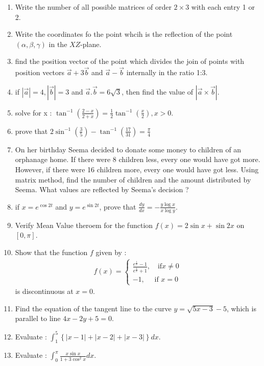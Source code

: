 \documentclass[journal,12pt,onecolumn]{IEEEtran}
\theoremstyle{remark}
\providecommand{\sbrak}[1]{\ensuremath{{}\left[#1\right]}}
\providecommand{\brak}[1]{\ensuremath{\left(#1\right)}}
\providecommand{\cbrak}[1]{\ensuremath{\left\{#1\right\}}}
\providecommand{\abs}[1]{\left\vert#1\right\vert}
\begin{document}
\begin{enumerate}
    \item Write the number of all possible matrices of order $2\times 3$ with each entry 1 or 2.
    \item Write the coordinates fo the point whcih is the reflection of the point \brak{\alpha,\beta,\gamma} in the $XZ$-plane.
    \item find the position vector of the point which divides the join of points with position vectors $\vec{a}+3\vec{b}$ and $\vec{a}-\vec{b}$ internally in the ratio 1:3.
    \item if $\abs{\vec{a}} = 4 , \abs{\vec{b}}=3$  and $\vec{a}.\vec{b}=6\sqrt{3}$, then find the value of $\abs{\vec{a}\times \vec{b}}$.
    \item solve for x : $\tan^{-1}\brak{\frac{2-x}{2+x}}=\frac{1}{2} \tan^{-1}\brak{\frac{x}{2}},x>0$.
    \item prove that $2\sin^{-1}\brak{\frac{3}{5}}-\tan^{-1}\brak{\frac{17}{31}}=\frac{\pi}{4}$
    \item On her birthday Seema decided to donate some money to children of an orphanage home. If there were 8 children less, every one would have got  more. However, if there were 16 children more, every one would have got  less. Using matrix method, find the number of children and the amount distributed by Seema. What values are reflected by Seema's decision ?
    \item if $x=e^{\cos 2t}$ and $y=e^{\sin 2t}$, prove that $\frac{dy}{dx}= -\frac{y \log x}{x \log y}$.
    \item Verify Mean Value theroem for the function $f\brak{x}= 2\sin x + \sin 2x$ on $\sbrak{0,\pi}$.
    \item Show that the function $f$ given by :
          \begin{align*}
              f\brak{x} = \begin{cases}
                              \frac{e^{\frac{1}{x}}-1}{e^{\frac{1}{x}}+1} ,\quad \text{if} x\neq 0 \\
                              -1,\quad \text{ if } x=0
                          \end{cases}
          \end{align*}
          is discontinuous at $x=0$.
    \item Find the equation of the tangent line to the curve $y=\sqrt{5x-3} -5$, which is parallel to line $4x-2y+5=0$.
    \item Evaluate : $\int_{1}^{5}\cbrak{\abs{x-1}+\abs{x-2}+\abs{x-3}}dx$.
    \item Evaluate : $\int_{0}^{\pi}\frac{x\sin x}{1+3\cos^2 x}dx$.

\end{enumerate}
\end{document}
